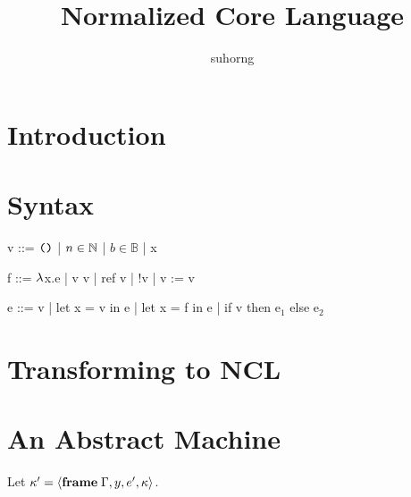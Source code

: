 \documentclass{article}
\begin{document}
\title{Normalized Core Language}
\author{suhorng}
\maketitle
\section{Introduction}
\section{Syntax}
\begin{minipage}{\textwidth}
\begin{minipage}[t]{0.33\textwidth}

\begin{code}
v  ::=  $\text{\texttt{()}}$
    |     $n\in\mathbb N$
    |     $b\in\mathbb{B}$
    |     x
\end{code}

\end{minipage}
\begin{minipage}[t]{0.33\textwidth}

\begin{code}
f  ::=  $\lambda$x.e
    |    v v
    |    ref v
    |    !v
    |    v := v
\end{code}

\end{minipage}
\begin{minipage}[t]{0.33\textwidth}

\begin{code}
e  ::=  v
    |    let x = v in e
    |    let x = f in e
    |    if v then e$_1$ else e$_2$
\end{code}

\end{minipage}
\end{minipage}
\section{Transforming to NCL}

\section{An Abstract Machine}
Let $\kappa' = \langle\mathbf{frame}\; \Gamma,y,e',\kappa\rangle$.
\end{document}
